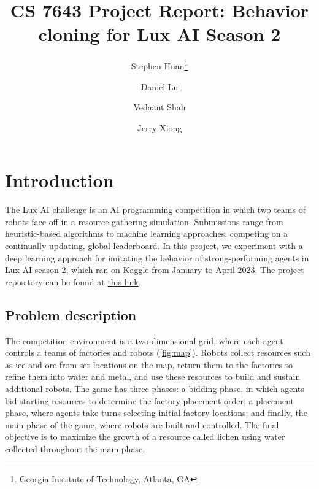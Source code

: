\documentclass[10pt,twocolumn,letterpaper]{article}
\begin{document}
\title{CS 7643 Project Report: Behavior cloning for Lux AI Season 2}

\author{
  Stephen Huan\thanks{%
    Georgia Institute of Technology, Atlanta, GA%
  }\\
  \and
  Daniel Lu\footnotemark[1]\\
  \and
  Vedaant Shah\footnotemark[1]\\
  \and
  Jerry Xiong\footnotemark[1]
}

\maketitle


\section{Introduction}\label{sec:intro}

The Lux AI challenge is an AI programming competition in which
two teams of robots face off in a resource-gathering simulation.
Submissions range from heuristic-based algorithms to machine learning
approaches, competing on a continually updating, global leaderboard.
In this project, we experiment with a deep learning approach
for imitating the behavior of strong-performing agents in Lux
AI season 2, which ran on Kaggle from January to April 2023.
The project repository can be found at
\href{https://github.com/jxiong21029/LuxS2}{this link}.

\subsection{Problem description}
\label{subsec:problem}

The competition environment is a two-dimensional grid, where each
agent controls a teams of factories and robots (\autoref{fig:map}).
Robots collect resources such as ice and ore from set locations on
the map, return them to the factories to refine them into water and
metal, and use these resources to build and sustain additional robots.
The game has three phases: a bidding phase, in which agents bid starting
resources to determine the factory placement order; a placement phase,
where agents take turns selecting initial factory locations; and finally,
the main phase of the game, where robots are built and controlled.
The final objective is to maximize the growth of a resource
called lichen using water collected throughout the main phase.
\end{document}
